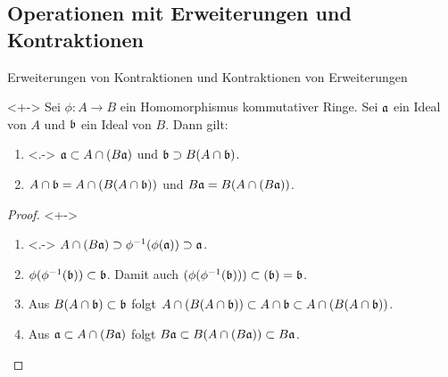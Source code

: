 \subsection{Operationen mit Erweiterungen und Kontraktionen}

\begin{frame}{Erweiterungen von Kontraktionen und Kontraktionen von Erweiterungen}
	\begin{proposition}<+->
		Sei \(\phi\colon A \to B\) ein Homomorphismus kommutativer Ringe.
		Sei \(\mathfrak{a}\) ein
		Ideal von \(A\) und \(\mathfrak{b}\) ein Ideal von \(B\). Dann gilt:
		\begin{enumerate}[<+->]
		\item<.->
			\(\mathfrak{a} \subset A \cap (B \mathfrak{a})\) und
			\(\mathfrak{b} \supset B (A \cap \mathfrak{b})\).
		\item
			\(A \cap \mathfrak{b} = A \cap (B (A \cap \mathfrak{b}))\) und
			\(B \mathfrak{a} = B (A \cap (B \mathfrak{a}))\).
		\end{enumerate}
	\end{proposition}
	\begin{proof}<+->
		\begin{enumerate}[<+->]
		\item<.->
			\(A \cap (B \mathfrak{a}) \supset \phi^{-1}(\phi(\mathfrak{a})) \supset
			\mathfrak{a}\).
		\item
			\(\phi(\phi^{-1}(\mathfrak{b})) \subset \mathfrak{b}\). Damit auch
			\((\phi(\phi^{-1}(\mathfrak{b}))) \subset (\mathfrak{b}) = \mathfrak{b}\).
		\item
			Aus \(B (A \cap \mathfrak{b}) \subset \mathfrak{b}\) 
			folgt \(A \cap (B (A \cap \mathfrak{b})) \subset
			A \cap \mathfrak{b} \subset A \cap (B (A \cap \mathfrak{b}))\). 
		\item
			Aus \(\mathfrak{a} \subset A \cap (B \mathfrak{a})\)
			folgt \(B \mathfrak{a} \subset B (A \cap (B \mathfrak{a})) \subset
			B \mathfrak{a}\).
			\qedhere
		\end{enumerate}
	\end{proof}
\end{frame}

